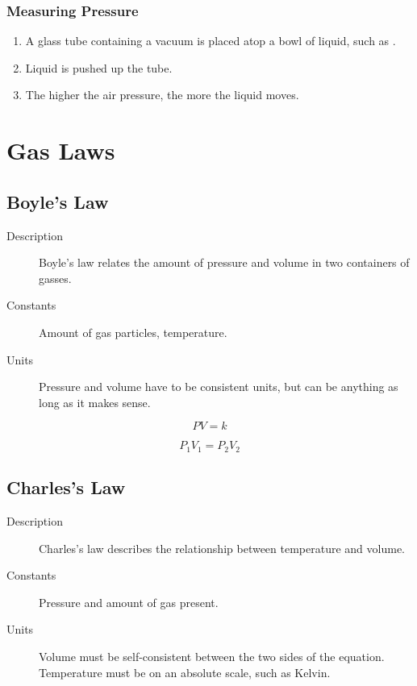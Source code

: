 \subsubsection{Measuring Pressure}
\begin{enumerate}
  \item A glass tube containing a vacuum is placed atop a bowl of liquid, such
    as .
  \item Liquid is pushed up the tube.
  \item The higher the air pressure, the more the liquid moves.
\end{enumerate}

\section{Gas Laws}
\subsection{Boyle's Law}
\begin{description}
  \item[Description] Boyle's law relates the amount of pressure and volume in
    two containers of gasses.
  \item[Constants] Amount of gas particles, temperature.
  \item[Units] Pressure and volume have to be consistent units, but can be
    anything as long as it makes sense.
\end{description}

\begin{equation}
  PV=k
\end{equation}

\begin{equation}
  P_1V_1=P_2V_2
\end{equation}

\subsection{Charles's Law}
\begin{description}
  \item[Description] Charles's law describes the relationship between
    temperature and volume.
  \item[Constants] Pressure and amount of gas present.
  \item[Units] Volume must be self-consistent between the two sides of the
    equation. Temperature must be on an absolute scale, such as Kelvin.
\end{description}

